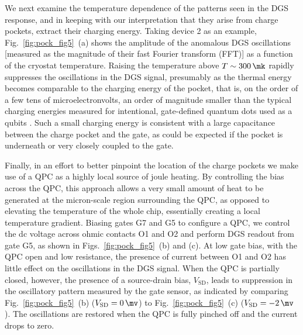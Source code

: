 We next examine the temperature dependence of the patterns seen in the DGS response, and in keeping with our interpretation that they arise from charge pockets, extract their charging energy. Taking device 2 as an example, Fig.~\ref{fig:pock_fig5}~(a) shows the amplitude of the anomalous DGS oscillations [measured as the magnitude of their fast Fourier transform (FFT)] as a function of the cryostat temperature. Raising the temperature  above $T \sim \SI{300}{\mk}$ rapidly suppresses the oscillations in the DGS signal, presumably as the thermal energy becomes comparable to the charging energy of the pocket, that is, on the order of a few tens of microelectronvolts, an order of magnitude smaller than the typical charging energies measured for intentional, gate-defined quantum dots used as a qubits \cite{Hanson:2007eg}. Such a small charging energy is consistent with a large capacitance between the charge pocket and the gate, as could be expected if the pocket is underneath or very closely coupled to the gate.

Finally, in an effort to better pinpoint the location of the charge pockets we make use of a QPC as a highly local source of joule heating. By controlling the bias across the QPC, this approach allows a very small amount of heat to be generated at the micron-scale region surrounding the QPC, as opposed to elevating the temperature of the whole chip, essentially creating a local temperature gradient. Biasing gates G7 and G5 to configure a QPC, we control the dc voltage across ohmic contacts O1 and O2 and perform DGS readout from gate G5, as shown in Figs.~\ref{fig:pock_fig5}~(b) and (c). At low gate bias, with the QPC open and low resistance, the presence of current between O1 and O2 has little effect on the oscillations in the DGS signal. When the QPC is partially closed, however, the presence of a source-drain bias, $V_{\textrm{SD}}$, leads to suppression in the oscillatory pattern measured by the gate sensor, as indicated by comparing Fig.~\ref{fig:pock_fig5}~(b) ($V_{\textrm{SD}} = \SI{0}{\mv}$) to Fig.~\ref{fig:pock_fig5}~(c) ($V_{\textrm{SD}} = \SI{-2}{\mv}$). The oscillations are restored when the QPC is fully pinched off and the current drops to zero.

